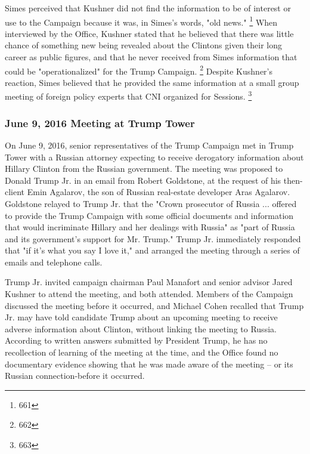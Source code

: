 Simes perceived that Kushner did not find the information to be of interest or use to the Campaign because it was, in Simes's words, "old news."%
\footnote{661}
When interviewed by the Office, Kushner stated that he believed that there was little chance of something new being revealed about the Clintons given their long career as public figures, and that he never received from Simes information that could be "operationalized" for the Trump Campaign.%
\footnote{662}
Despite Kushner's reaction, Simes believed that he provided the same information at a small group meeting of foreign policy experts that CNI organized for Sessions.%
\footnote{663}

\subsubsection{June 9, 2016 Meeting at Trump Tower}

On June 9, 2016, senior representatives of the Trump Campaign met in Trump Tower with a Russian attorney expecting to receive derogatory information about Hillary Clinton from the Russian government.
The meeting was proposed to Donald Trump Jr. in an email from Robert Goldstone, at the request of his then-client Emin Agalarov, the son of Russian real-estate developer Aras Agalarov.
Goldstone relayed to Trump Jr. that the "Crown prosecutor of Russia ... offered to provide the Trump Campaign with some official documents and information that would incriminate Hillary and her dealings with Russia" as "part of Russia and its government's support for Mr. Trump."
Trump Jr. immediately responded that "if it's what you say I love it," and arranged the meeting through a series of emails and telephone calls.

Trump Jr. invited campaign chairman Paul Manafort and senior advisor Jared Kushner to attend the meeting, and both attended.
Members of the Campaign discussed the meeting before it occurred, and Michael Cohen recalled that Trump Jr. may have told candidate Trump about an upcoming meeting to receive adverse information about Clinton, without linking the meeting to Russia.
According to written answers submitted by President Trump, he has no recollection of learning of the meeting at the time, and the Office found no documentary evidence showing that he was made aware of the meeting -- or its Russian connection-before it occurred.


